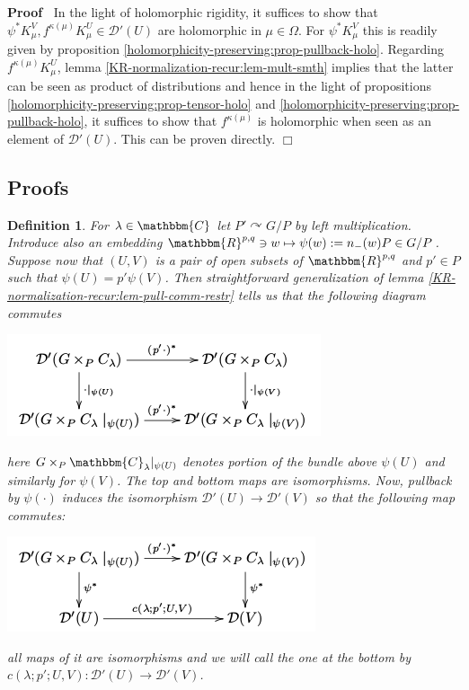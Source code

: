 \documentclass{article}
\newcommand{\assign}{:=}
\newenvironment{proof}{\noindent\textbf{Proof\ }}{\hspace*{\fill}$\Box$\medskip}
\newtheorem{definition}{Definition}
\numberwithin{definition}{section}
\numberwithin{lemma}{section}
\numberwithin{proposition}{section}
{\theorembodyfont{\rmfamily}\newtheorem{remark}{Remark}
\numberwithin{remark}{section}
}
\begin{document}
\begin{proof}
  In the light of holomorphic rigidity, it suffices to show that $\psi^{\ast}
  K^V_{\mu}, f^{\kappa ( \mu)} K^U_{\mu} \in \mathcal{D}' ( U)$ are
  holomorphic in $\mu \in \Omega$. For $\psi^{\ast} K_{\mu}^V$ this is readily
  given by proposition \ref{holomorphicity-preserving:prop-pullback-holo}.
  Regarding $f^{\kappa ( \mu)} K^U_{\mu}$, lemma
  \ref{KR-normalization-recur:lem-mult-smth} implies that the latter can be
  seen as product of distributions and hence in the light of propositions
  \ref{holomorphicity-preserving:prop-tensor-holo} and
  \ref{holomorphicity-preserving:prop-pullback-holo}, it suffices to show that
  $f^{\kappa ( \mu)}$ is holomorphic when seen as an element of $\mathcal{D}'
  ( U)$. This can be proven directly.
\end{proof}

\subsection{Proofs}

\begin{definition}
  \label{sol:def-localaciton}For $\lambda \in \mathbbm{C}$ let $P'
  \curvearrowright G / P$ by left multiplication. Introduce also an embedding
  $\mathbbm{R}^{p, q} \ni w \mapsto \psi ( w) \assign n_- ( w) P \in G / P$.
  Suppose now that $( U, V)$ is a pair of open subsets of $\mathbbm{R}^{p, q}$
  and $p' \in P$ such that $\psi ( U) = p' \psi ( V)$. Then straightforward
  generalization of lemma \ref{KR-normalization-recur:lem-pull-comm-restr}
  tells us that the following diagram commutes
  \begin{center}
    \includegraphics[scale=0.6]{master_master-7.png}
  \end{center}
  here $G \times_P \mathbbm{C}_{\lambda} |_{\psi ( U)}$ denotes portion of the
  bundle above $\psi ( U)$ and similarly for $\psi ( V)$. The top and bottom
  maps are isomorphisms. Now, pullback by $\psi ( \cdot)$ induces the
  isomorphism $\mathcal{D}' ( U) \rightarrow \mathcal{D}' ( V)$ so that the
  following map commutes:
  
  \begin{center}
    \includegraphics[scale=0.6]{master_master-8.png}
  \end{center}
  
  all maps of it are isomorphisms and we will call the one at the bottom by $c
  ( \lambda ; p' ; U, V) : \mathcal{D}' ( U) \rightarrow \mathcal{D}' ( V)$.
\end{definition}
\end{document}
